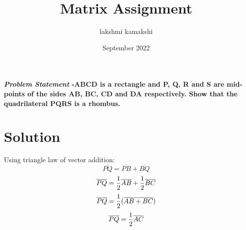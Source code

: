 \documentclass[journal,10pt,twocolumn]{article}
\title{\textbf{Matrix Assignment}}
\author{lakshmi kamakshi}
\date{September 2022}
\begin{document}
\maketitle
\paragraph{\textit{Problem Statement} -ABCD is a rectangle and P, Q, R and S are mid-points of the sides AB, BC, CD and DA
respectively. Show that the quadrilateral PQRS is a rhombus.}
\vspace{5mm}

\section*{Solution}

Using triangle law of vector addition:
\begin{equation}
	\overline{PQ}= \overline{PB} + \overline{BQ} 
\end{equation}
\begin{equation}
		  \overline{PQ}  = \frac{1}{2}\overline{AB} + \frac{1}{2}\overline{BC} \\
\end{equation}
\begin{equation}
	\overline{PQ} =\frac{1}{2}(\overline{AB+BC})\\
\end{equation}
\begin{equation}
	  \overline{PQ} =\frac{1}{2}\overline{AC} \\
\end{equation}
\end{document}
